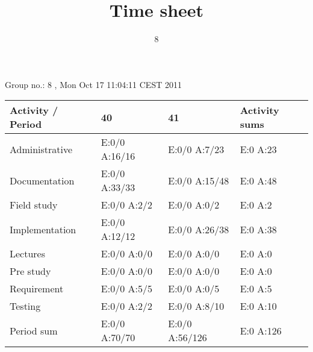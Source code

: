 \documentclass[a4paper]{article}
\title{Time sheet}
\author{8}
\begin{document}
\begin{landscape}
\begin{center}
	Group no.: 8
	, Mon Oct 17 11:04:11 CEST 2011

	\begin{tabular}{| l | l | l | l |}
		\hline
		Activity / Period & 40 & 41 & Activity sums \\
		\hline \hline
		
Administrative & E:0/0 A:16/16 & E:0/0 A:7/23 & E:0 A:23 \\
Documentation & E:0/0 A:33/33 & E:0/0 A:15/48 & E:0 A:48 \\
Field study & E:0/0 A:2/2 & E:0/0 A:0/2 & E:0 A:2 \\
Implementation & E:0/0 A:12/12 & E:0/0 A:26/38 & E:0 A:38 \\
Lectures & E:0/0 A:0/0 & E:0/0 A:0/0 & E:0 A:0 \\
Pre study & E:0/0 A:0/0 & E:0/0 A:0/0 & E:0 A:0 \\
Requirement & E:0/0 A:5/5 & E:0/0 A:0/5 & E:0 A:5 \\
Testing & E:0/0 A:2/2 & E:0/0 A:8/10 & E:0 A:10 \\
Period sum & E:0/0 A:70/70 & E:0/0 A:56/126 & E:0 A:126 \\
		\hline
	\end{tabular}
\end{center}
\end{landscape}
\end{document}
